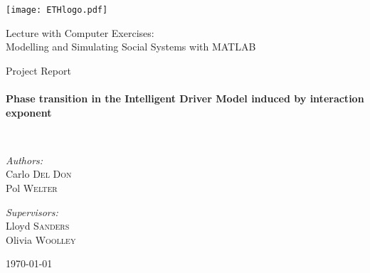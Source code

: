 \begin{titlepage} \begin{center}
        
    \begin{flushright}
        \texttt{[image: ETHlogo.pdf]}~\\[1cm]
    \end{flushright}
        
        
    \vspace{4cm}
    \LARGE{ 	Lecture with Computer Exercises:\\ }
    \LARGE{ Modelling and Simulating Social Systems with MATLAB\\}
    
    \bigskip\bigskip
    
    \small{Project Report}\\
    
            
    \HRule \\[0.4cm] { \huge \bfseries Phase transition in the Intelligent Driver Model induced by interaction exponent\\[0.4cm] }
    
    \HRule \\[1.5cm]
    
    \noindent 
    \begin{minipage}[t]{0.4\textwidth} 
        \begin{flushleft} 
            \large \emph{Authors:}\\ Carlo \textsc{Del Don}\\ Pol \textsc{Welter} 
        \end{flushleft} 
    \end{minipage}
    \begin{minipage}[t]{0.4\textwidth}
        \begin{flushright}
            \large \emph{Supervisors:} \\
            Lloyd \textsc{Sanders} \\
            Olivia \textsc{Woolley} \\
        \end{flushright}
    \end{minipage}
    
    \vfill
    
    {\large \today}
        
\end{center} \end{titlepage}